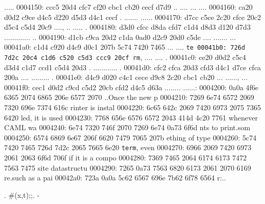 \begin{bo
00010e0: 7865 647d 5c62 6567 696e 7b76 6572 6261  xed}
\begin{verba
00010f0: 7469 6d7d 0a20 2023 7479 7065 2074 6572  tim}
\begin{
0001c40: 7665 7262 6174 696d 7d0a 2020 236c 6574  verbatim}
\begin{boxe
00027a0: 647d 5c62 6567 696e 7b76 6572 6261 7469  d}
\begin{verbati
00027b0: 6d7d 0a20 2023 6c65 7420 696e 6669 7865  m}
\begin{v
0002c60: 6572 6261 7469 6d7d 0a20 2023 6c65 7420  erbatim}
\begin{
0002dc0: 7665 7262 6174 696d 7d0a 2020 236c 6574  verbatim}
\begin{boxed
0002f30: 7d5c 6265 6769 6e7b 7665 7262 6174 696d  }
\begin{verbatim
0002f40: 7d0a 2020 236c 6574 2068 6428 683a 3a74  }
\begin{v
0003e60: 6572 6261 7469 6d7d 0a20 2023 236f 7065  erbatim}
.....
0004150: ccc5 20d4 cfc7 cf20 cbc1 cb20 cecf d7d9  .. .... ... ....
0004160: ca20 d0d2 c9ce d4c5 d220 d5d3 d4c1 cecf  . ....... ......
0004170: d7cc c5ce 2c20 cfce 20c2 d5c4 c5d4 20c9  ...., .. ..... .
0004180: d3d0 cfcc d8da cfd7 c1d4 d8d3 d120 d7d3  ............. ..
0004190: d1cb c9ca 20d2 c1da 0ad0 d2c9 20d0 c5de  .... ....... ...
00041a0: c1d4 c920 d4c9 d0c1 207b 5c74 7420 7465  ... .... {\tt te
00041b0: 726d 7d2c 20c4 c1d6 c520 c5d3 ccc9 20cf  rm}, .... .... .
00041c0: ce20 d0d2 c5c4 d3d4 c1d7 ccd1 c5d4 20d3  . ............ .
00041d0: cfc2 cfca 20d3 cfd3 d4c1 d7ce cfca 200a  .... ......... .
00041e0: d4c9 d020 c4c1 cece d9c8 2c20 cbc1 cb20  ... ......, ... 
00041f0: cec1 d0d2 c9cd c5d2 20cb cfd2 d4c5 d63a  ........ ......:
0004200: 0a0a 4f6e 6365 2074 6865 206e 6577 2070  ..Once the new p
0004210: 7269 6e74 6572 2069 7320 696e 7374 616c  rinter is instal
0004220: 6c65 642c 2069 7420 6973 2075 7365 6420  led, it is used 
0004230: 7768 656e 6576 6572 2043 414d 4c20 7761  whenever CAML wa
0004240: 6e74 7320 746f 2070 7269 6e74 0a73 6f6d  nts to print.som
0004250: 6574 6869 6e67 206f 6620 7479 7065 207b  ething of type {
0004260: 5c74 7420 7465 726d 7d2c 2065 7665 6e20  \tt term}, even 
0004270: 6966 2069 7420 6973 2061 2063 6f6d 706f  if it is a compo
0004280: 7369 7465 2064 6174 6173 7472 7563 7475  site datastructu
0004290: 7265 0a73 7563 6820 6173 2061 2070 6169  re.such as a pai
00042a0: 723a 0a0a 5c62 6567 696e 7b62 6f78 6564  r:..\begin{boxed
00042b0: 7d5c 6265 6769 6e7b 7665 7262 6174 696d  }\begin{verbatim
00042c0: 7d0a 2020 2328 782c 7429 3b3b 0a20 202d  }.  #(x,t);;.  -

\end{verbatim
00042c0: 7d0a 2020 2328 782c 7429 3b3b 0a20 202d  }
\end{boxed
00042b0: 7d5c 6265 6769 6e7b 7665 7262 6174 696d  }
\end{v
0003e60: 6572 6261 7469 6d7d 0a20 2023 236f 7065  erbatim}
\end{verbatim
0002f40: 7d0a 2020 236c 6574 2068 6428 683a 3a74  }
\end{boxed
0002f30: 7d5c 6265 6769 6e7b 7665 7262 6174 696d  }
\end{
0002dc0: 7665 7262 6174 696d 7d0a 2020 236c 6574  verbatim}
\end{v
0002c60: 6572 6261 7469 6d7d 0a20 2023 6c65 7420  erbatim}
\end{verbati
00027b0: 6d7d 0a20 2023 6c65 7420 696e 6669 7865  m}
\end{boxe
00027a0: 647d 5c62 6567 696e 7b76 6572 6261 7469  d}
\end{
0001c40: 7665 7262 6174 696d 7d0a 2020 236c 6574  verbatim}
\end{verba
00010f0: 7469 6d7d 0a20 2023 7479 7065 2074 6572  tim}
\end{bo
00010e0: 7865 647d 5c62 6567 696e 7b76 6572 6261  xed}
